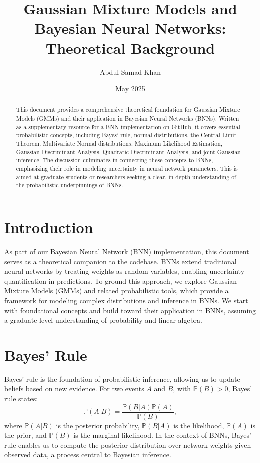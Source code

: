 \documentclass[12pt]{article}
\theoremstyle{plain}
\theoremstyle{definition}
\renewcommand{\P}{\mathbb{P}}
\begin{document}
\title{Gaussian Mixture Models and Bayesian Neural Networks: Theoretical Background}
\author{Abdul Samad Khan}
\date{May 2025}
\maketitle

\begin{abstract}
This document provides a comprehensive theoretical foundation for Gaussian Mixture Models (GMMs) and their application in Bayesian Neural Networks (BNNs). Written as a supplementary resource for a BNN implementation on GitHub, it covers essential probabilistic concepts, including Bayes' rule, normal distributions, the Central Limit Theorem, Multivariate Normal distributions, Maximum Likelihood Estimation, Gaussian Discriminant Analysis, Quadratic Discriminant Analysis, and joint Gaussian inference. The discussion culminates in connecting these concepts to BNNs, emphasizing their role in modeling uncertainty in neural network parameters. This is aimed at graduate students or researchers seeking a clear, in-depth understanding of the probabilistic underpinnings of BNNs.
\end{abstract}

\section{Introduction}
As part of our Bayesian Neural Network (BNN) implementation, this document serves as a theoretical companion to the codebase. BNNs extend traditional neural networks by treating weights as random variables, enabling uncertainty quantification in predictions. To ground this approach, we explore Gaussian Mixture Models (GMMs) and related probabilistic tools, which provide a framework for modeling complex distributions and inference in BNNs. We start with foundational concepts and build toward their application in BNNs, assuming a graduate-level understanding of probability and linear algebra.

\section{Bayes' Rule}
Bayes' rule is the foundation of probabilistic inference, allowing us to update beliefs based on new evidence. For two events \( A \) and \( B \), with \( \P(B) > 0 \), Bayes' rule states:
\begin{equation}
\P(A|B) = \frac{\P(B|A)\P(A)}{\P(B)},
\end{equation}
where \( \P(A|B) \) is the posterior probability, \( \P(B|A) \) is the likelihood, \( \P(A) \) is the prior, and \( \P(B) \) is the marginal likelihood. In the context of BNNs, Bayes' rule enables us to compute the posterior distribution over network weights given observed data, a process central to Bayesian inference.
\end{document}
